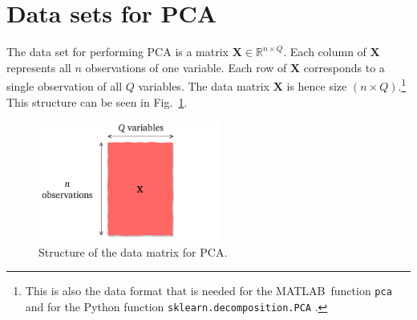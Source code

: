 \documentclass[10pt,twocolumn]{article}
\begin{document}
%
%
%
%
%
%
%

\section{Data sets for PCA}

The data set for performing PCA is a matrix $\mathbf{X} \in \mathbb{R}^{n \times Q}$. Each column of $\mathbf{X}$ represents all $n$ observations of one variable. Each row of $\mathbf{X}$ corresponds to a single observation of all $Q$ variables. The data matrix $\mathbf{X}$ is hence size $(n \times Q)$.\footnote{This is also the data format that is needed for the MATLAB\textregistered \, function \texttt{pca} \cite{Matlab-pca} and for the Python function \texttt{sklearn.decomposition.PCA} \cite{Python-pca}.} This structure can be seen in Fig.~\ref{fig:data-matrix}.

\begin{figure}[H]
\centering\includegraphics[width=6cm]{data-set-PCA.pdf}
\caption{Structure of the data matrix for PCA.}
\label{fig:data-matrix}
\end{figure}
\end{document}
